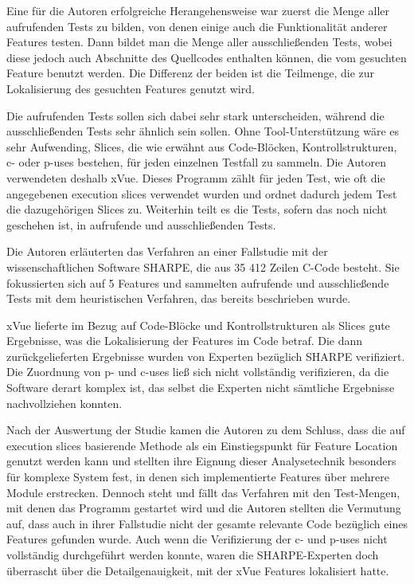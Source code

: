 \documentclass[runningheads,a4paper]{llncs}
\begin{document}
Eine für die Autoren erfolgreiche Herangehensweise war zuerst die Menge aller aufrufenden Tests zu bilden, von denen einige auch die Funktionalität anderer Features testen. Dann bildet man die Menge aller ausschließenden Tests, wobei diese jedoch auch Abschnitte des Quellcodes enthalten können, die vom gesuchten Feature benutzt werden. Die Differenz der beiden ist die Teilmenge, die zur Lokalisierung des gesuchten Features genutzt wird.

Die aufrufenden Tests sollen sich dabei sehr stark unterscheiden, während die ausschließenden Tests sehr ähnlich sein sollen. Ohne Tool-Unterstützung wäre es sehr Aufwending, Slices, die wie erwähnt aus Code-Blöcken, Kontrollstrukturen, c- oder p-uses bestehen, für jeden einzelnen Testfall zu sammeln. Die Autoren verwendeten deshalb xVue. Dieses Programm zählt für jeden Test, wie oft die angegebenen execution slices verwendet wurden und ordnet dadurch jedem Test die dazugehörigen Slices zu. Weiterhin teilt es die Tests, sofern das noch nicht geschehen ist, in aufrufende und ausschließenden Tests.

Die Autoren erläuterten das Verfahren an einer Fallstudie mit der wissenschaftlichen Software SHARPE, die aus 35 412 Zeilen C-Code besteht. Sie fokussierten sich auf 5 Features und sammelten aufrufende und ausschließende Tests mit dem heuristischen Verfahren, das bereits beschrieben wurde.

xVue lieferte im Bezug auf Code-Blöcke und Kontrollstrukturen als Slices gute Ergebnisse, was die Lokalisierung der Features im Code betraf. Die dann zurückgelieferten Ergebnisse wurden von Experten bezüglich SHARPE verifiziert. Die Zuordnung von p- und c-uses ließ sich nicht vollständig verifizieren, da die Software derart komplex ist, das selbst die Experten nicht sämtliche Ergebnisse nachvollziehen konnten.

Nach der Auswertung der Studie kamen die Autoren zu dem Schluss, dass die auf execution slices basierende Methode als ein Einstiegspunkt für Feature Location genutzt werden kann und stellten ihre Eignung dieser Analysetechnik besonders für komplexe System fest, in denen sich implementierte Features über mehrere Module erstrecken. Dennoch steht und fällt das Verfahren mit den Test-Mengen, mit denen das Programm gestartet wird und die Autoren stellten die Vermutung auf, dass auch in ihrer Fallstudie nicht der gesamte relevante Code bezüglich eines Features gefunden wurde. Auch wenn die Verifizierung der c- und p-uses nicht vollständig durchgeführt werden konnte, waren die SHARPE-Experten doch überrascht über die Detailgenauigkeit, mit der xVue Features lokalisiert hatte.
\end{document}

